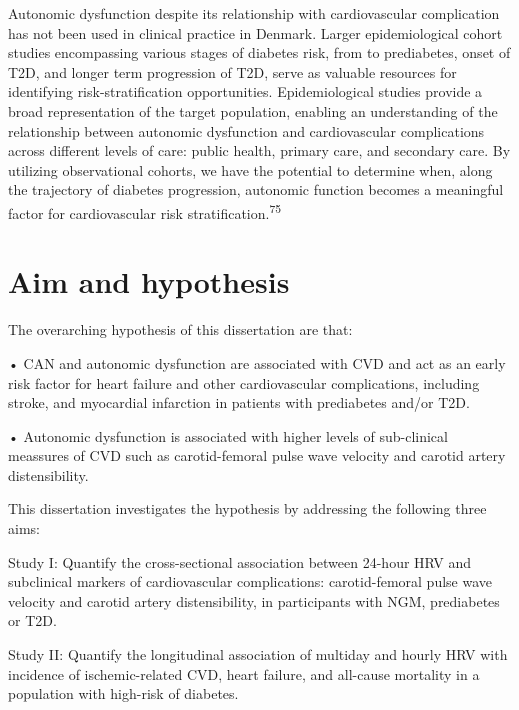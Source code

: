 \documentclass[
  a4paper,
  headsepline=true,
  open=left]{scrbook}
\begin{document}
Autonomic dysfunction despite its relationship with cardiovascular
complication has not been used in clinical practice in Denmark. Larger
epidemiological cohort studies encompassing various stages of diabetes
risk, from to prediabetes, onset of T2D, and longer term progression of
T2D, serve as valuable resources for identifying risk-stratification
opportunities. Epidemiological studies provide a broad representation of
the target population, enabling an understanding of the relationship
between autonomic dysfunction and cardiovascular complications across
different levels of care: public health, primary care, and secondary
care. By utilizing observational cohorts, we have the potential to
determine when, along the trajectory of diabetes progression, autonomic
function becomes a meaningful factor for cardiovascular risk
stratification.\textsuperscript{75}

\clearpage
\null
\thispagestyle{empty}
\clearpage


\hypertarget{aim-and-hypothesis}{%
\chapter{Aim and hypothesis}\label{aim-and-hypothesis}}

\clearpage
\null
\thispagestyle{empty}
\clearpage

The overarching hypothesis of this dissertation are that:

• CAN and autonomic dysfunction are associated with CVD and act as an
early risk factor for heart failure and other cardiovascular
complications, including stroke, and myocardial infarction in patients
with prediabetes and/or T2D.

• Autonomic dysfunction is associated with higher levels of sub-clinical
meassures of CVD such as carotid-femoral pulse wave velocity and carotid
artery distensibility.

This dissertation investigates the hypothesis by addressing the
following three aims:

Study I: Quantify the cross-sectional association between 24-hour HRV
and subclinical markers of cardiovascular complications: carotid-femoral
pulse wave velocity and carotid artery distensibility, in participants
with NGM, prediabetes or T2D.

Study II: Quantify the longitudinal association of multiday and hourly
HRV with incidence of ischemic-related CVD, heart failure, and all-cause
mortality in a population with high-risk of diabetes.
\end{document}
